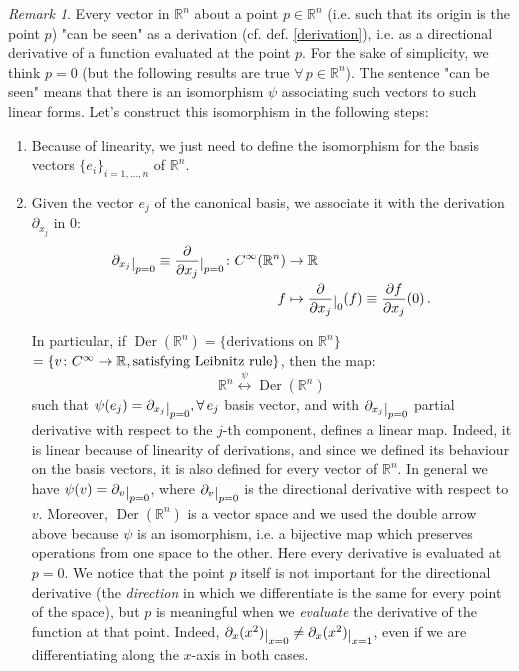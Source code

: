 \documentclass[a4paper,11pt,titlepage, article, oneside]{memoir}
\numberwithin{equation}{section}
\theoremstyle{definition}
\theoremstyle{remark}
\newtheorem{remark}[theorem]{Remark}
\DeclareMathOperator{\Der}{Der}
\newcommand{\rfield}{\mathbb{R}}
\newcommand{\restrict}[2]{{#1}\raisebox{-.5ex}{$|$}_{#2}}
\begin{document}
\begin{remarkbox}\begin{remark}\label{vectorasder}
Every vector in $\rfield^n$ about a point $p \in \rfield^n$ (i.e. such that its origin is the point $p$) "can be seen" as a derivation (cf. def. \ref{derivation}), i.e. as a directional derivative of a function evaluated at the point $p$. For the sake of simplicity, we think $p=0$ (but the following results are true $\forall \, p \in \rfield^n$).
The sentence "can be seen" means that there is an isomorphism $\psi$ associating such vectors to such linear forms. Let's construct this isomorphism in the following steps:

\begin{enumerate}
\item Because of linearity, we just need to define the isomorphism for the basis vectors $\{ e_i \}_{i=1,\ldots,n}$ of $\rfield^n$.
\item Given the vector $e_j$ of the canonical basis, we associate it with the derivation $\partial_{x_j}$ in 0:
\begin{align}
\restrict{\partial_{x_j}}{p=0} \equiv \restrict{\frac{\partial}{\partial x_j}}{p=0} \colon C^{\infty}(\rfield^n) &\rightarrow \rfield \\
f &\mapsto \restrict{\frac{\partial}{\partial x_j}}{0} (f) \equiv \frac{\partial f}{\partial x_j} (0) \nonumber \, .
\end{align}

In particular, if $\Der(\rfield^n) = \{ \text{derivations on }\rfield^n\}$ $ = \{ v\colon C^{\infty}\rightarrow \rfield, \\ \text{satisfying Leibnitz rule}\}$, then the map:
\begin{equation}
   \rfield^n \overset{\psi}{\longleftrightarrow}\Der(\rfield^n)
\end{equation}
such that $\psi(e_j) = \restrict{\partial_{x_j}}{p=0}, \forall \, e_j$ basis vector, and with $\restrict{\partial_{x_j}}{p=0}$ partial derivative with respect to the $j$-th component, defines a linear map. Indeed, it is linear because of linearity of derivations, and since we defined its behaviour on the basis vectors, it is also defined for every vector of $\rfield^n$. In general we have $\psi(v)=\restrict{\partial_{v}}{p=0}$, where $\restrict{\partial_v}{p=0}$ is the directional derivative with respect to $v$. Moreover, $\Der(\rfield^n)$ is a vector space and we used the double arrow above because $\psi$ is an isomorphism, i.e. a bijective map which preserves operations from one space to the other. Here every derivative is evaluated at $p=0$. We notice that the point $p$ itself is not important for the directional derivative (the \textit{direction} in which we differentiate is the same for every point of the space), but $p$ is meaningful when we \textit{evaluate} the derivative of the function at that point. Indeed, $\restrict{\partial_x (x^2)}{x=0} \not = \restrict{\partial_x (x^2)}{x=1}$, even if we are differentiating along the $x$-axis in both cases.
\end{enumerate}



\end{remark}
\end{remarkbox}
\end{document}
